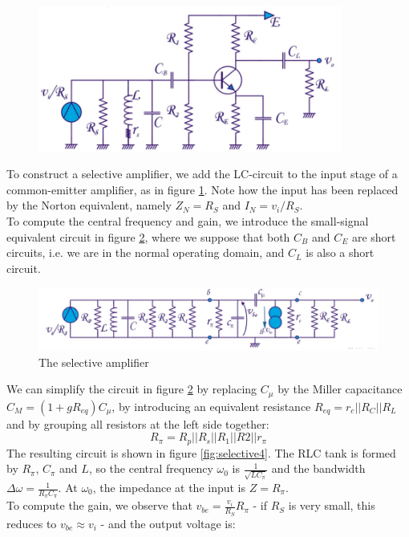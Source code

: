 \begin{figure}[h!]
	\centering
	\includegraphics[width=10cm]{figures/ch09/selective2.jpg}
	\caption{}
	\label{fig:selective2}
\end{figure}
To construct a selective amplifier, we add the LC-circuit to the input stage of a common-emitter amplifier, as in figure \ref{fig:selective2}. Note how the input has been replaced by the Norton equivalent, namely $Z_N = R_S$ and $I_N = v_i/R_S$. \\
To compute the central frequency and gain, we introduce the small-signal equivalent circuit in figure \ref{fig:selective3}, where we suppose that both $C_B$ and $C_E$ are short circuits, i.e. we are in the normal operating domain, and $C_L$ is also a short circuit.\\
\begin{figure}[h!]
	\centering
	\includegraphics[width=14cm]{figures/ch09/selective3.jpg}
	\caption{The selective amplifier}
	\label{fig:selective3}
\end{figure}
We can simplify the circuit in figure \ref{fig:selective3} by replacing $C_\mu$ by the Miller capacitance $C_M = (1 + g R_{eq}) C_\mu$, by introducing an equivalent resistance $R_{eq} = r_c || R_C || R_L$ and by grouping all resistors at the left side together: 
$$R_\pi = R_p || R_s || R_1 || R2 || r_\pi$$
The resulting circuit is shown in figure \ref{fig:selective4}. The RLC tank is formed by $R_\pi$, $C_\pi$ and $L$, so the central frequency $\omega_0$ is $\frac{1}{\sqrt{LC_\pi}}$ and the bandwidth $\Delta \omega = \frac{1}{R_\pi C_\pi}$. At $\omega_0$, the  impedance at the input is $Z = R_\pi$.\\
To compute the gain, we observe that $v_{be} = \frac{v_i}{R_S} R_\pi$ - if $R_S$ is very small, this reduces to $v_{be} \approx v_i$ - and the output voltage is:
